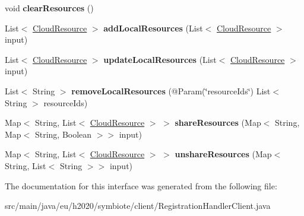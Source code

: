 \begin{DoxyCompactItemize}
void {\bfseries clear\+Resources} ()
\item 
\mbox{\label{interfaceeu_1_1h2020_1_1symbiote_1_1client_1_1RegistrationHandlerClient_a839a9dd375af93ff8271e702c8791749}} 
List$<$ \hyperlink{classeu_1_1h2020_1_1symbiote_1_1cloud_1_1model_1_1internal_1_1CloudResource}{Cloud\+Resource} $>$ {\bfseries add\+Local\+Resources} (List$<$ \hyperlink{classeu_1_1h2020_1_1symbiote_1_1cloud_1_1model_1_1internal_1_1CloudResource}{Cloud\+Resource} $>$ input)
\item 
\mbox{\label{interfaceeu_1_1h2020_1_1symbiote_1_1client_1_1RegistrationHandlerClient_a16e83caa78bee9fe88c0bf54fe9d6297}} 
List$<$ \hyperlink{classeu_1_1h2020_1_1symbiote_1_1cloud_1_1model_1_1internal_1_1CloudResource}{Cloud\+Resource} $>$ {\bfseries update\+Local\+Resources} (List$<$ \hyperlink{classeu_1_1h2020_1_1symbiote_1_1cloud_1_1model_1_1internal_1_1CloudResource}{Cloud\+Resource} $>$ input)
\item 
\mbox{\label{interfaceeu_1_1h2020_1_1symbiote_1_1client_1_1RegistrationHandlerClient_a02d4e2e9c738c5737a197e29e62e7ad1}} 
List$<$ String $>$ {\bfseries remove\+Local\+Resources} (@Param(\char`\"{}resource\+Ids\char`\"{}) List$<$ String $>$ resource\+Ids)
\item 
\mbox{\label{interfaceeu_1_1h2020_1_1symbiote_1_1client_1_1RegistrationHandlerClient_aacdc56a75103d4842026fc984772e871}} 
Map$<$ String, List$<$ \hyperlink{classeu_1_1h2020_1_1symbiote_1_1cloud_1_1model_1_1internal_1_1CloudResource}{Cloud\+Resource} $>$ $>$ {\bfseries share\+Resources} (Map$<$ String, Map$<$ String, Boolean $>$$>$ input)
\item 
\mbox{\label{interfaceeu_1_1h2020_1_1symbiote_1_1client_1_1RegistrationHandlerClient_a0c08a85a643ee43a85c030d5e87780e6}} 
Map$<$ String, List$<$ \hyperlink{classeu_1_1h2020_1_1symbiote_1_1cloud_1_1model_1_1internal_1_1CloudResource}{Cloud\+Resource} $>$ $>$ {\bfseries unshare\+Resources} (Map$<$ String, List$<$ String $>$$>$ input)
\end{DoxyCompactItemize}


The documentation for this interface was generated from the following file\+:\begin{DoxyCompactItemize}
\item 
src/main/java/eu/h2020/symbiote/client/Registration\+Handler\+Client.\+java\end{DoxyCompactItemize}
